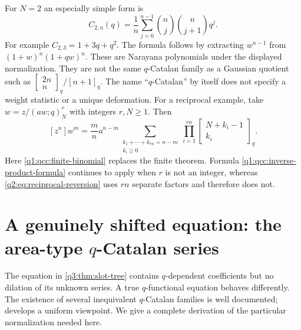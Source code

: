 \documentclass[11pt,a4paper,oneside,openany]{book}
\theoremstyle{definition}
\theoremstyle{remark}
\newcommand{\GB}[3][q]{\begin{bmatrix}#2\\#3\end{bmatrix}_{#1}}
\newcommand{\qb}[2]{\GB{#1}{#2}}
\newcommand{\poch}[3]{(#1;#2)_{#3}}
\newcommand{\G}[2]{\GB{#1}{#2}}
\begin{document}
For $N=2$ an especially simple form is
\begin{equation}
 C_{2,n}(q)=\frac1n\sum_{j=0}^{n-1}
                \binom nj\binom n{j+1}q^j.
 \label{q3:eq:narayana-slot}
\end{equation}
For example $C_{2,3}=1+3q+q^2$. The formula follows by extracting
$w^{n-1}$ from $(1+w)^n(1+qw)^n$.
These are Narayana polynomials under the displayed normalization.
They are not the same $q$-Catalan family as a Gaussian quotient such as
$\G{2n}n/[n+1]_q$. The name ``$q$-Catalan'' by itself does not specify
a weight statistic or a unique deformation.
For a reciprocal example, take
$w=z/\poch{aw}qN^r$ with integers $r,N\ge1$. Then
\begin{equation}\label{q2:eq:reciprocal-reversion}
 [z^n]w^m=\frac mn a^{n-m}
 \sum_{\substack{k_1+\cdots+k_{rn}=n-m\\k_i\ge0}}
       \prod_{i=1}^{rn}\qb{N+k_i-1}{k_i}.
\end{equation}
Here \cref{q1:qcc:finite-binomial} replaces the finite theorem. Formula
\eqref{q1:qcc:inverse-product-formula} continues to apply when $r$ is not an integer, whereas
\eqref{q2:eq:reciprocal-reversion} uses $rn$ separate factors and therefore does not.
\section{A genuinely shifted equation: the area-type \texorpdfstring{$q$}{q}-Catalan series}\label{q2:sec:qcatalan}
The equation in \cref{q3:thm:slot-tree} contains $q$-dependent coefficients but no dilation
of its unknown series. A true $q$-functional equation behaves differently. The
existence of several inequivalent $q$-Catalan families is well documented;
\cite{cigler} develops a uniform viewpoint. We give a complete derivation of the
particular normalization needed here.
\end{document}
